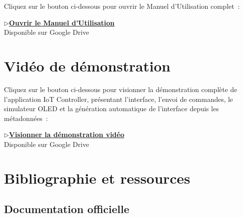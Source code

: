\documentclass[12pt, a4paper]{report}
\begin{document}
Cliquez sur le bouton ci-dessous pour ouvrir le Manuel d'Utilisation
complet~:

\vspace{1cm}
\begin{center}
\begin{tcolorbox}[
  enhanced, colback=bleuClair, colframe=bleuPrincipal,
  boxrule=1.5pt, arc=6pt, width=0.72\textwidth,
  halign=center, left=12pt, right=12pt,
  top=14pt, bottom=14pt,
]
  \href{https://drive.google.com/file/d/1Pbwp4Xd4XEElCwQaQ0MdwwGoU7PmZTh9/view?usp=drive_link}{%
    \textcolor{bleuFonce}{\Large\bfseries
    $\triangleright$\enspace Ouvrir le Manuel d'Utilisation}%
  }\\[8pt]
  {\small\textcolor{griMoyen}{Disponible sur Google Drive}}
\end{tcolorbox}
\end{center}

\chapter{Vid\'eo de d\'emonstration}

Cliquez sur le bouton ci-dessous pour visionner la d\'emonstration
compl\`ete de l'application IoT Controller, pr\'esentant l'interface,
l'envoi de commandes, le simulateur OLED et la g\'en\'eration
automatique de l'interface depuis les m\'etadonn\'ees~:

\vspace{1cm}
\begin{center}
\begin{tcolorbox}[
  enhanced, colback=bleuClair, colframe=bleuPrincipal,
  boxrule=1.5pt, arc=6pt, width=0.72\textwidth,
  halign=center, left=12pt, right=12pt,
  top=14pt, bottom=14pt,
]
  \href{https://drive.google.com/file/d/1ZKkiPMIA36Nbi1gCWcmVh21lzbyH2on8/view?usp=sharing}{%
    \textcolor{bleuFonce}{\Large\bfseries
    $\triangleright$\enspace Visionner la d\'emonstration vid\'eo}%
  }\\[8pt]
  {\small\textcolor{griMoyen}{Disponible sur Google Drive}}
\end{tcolorbox}
\end{center}

\chapter{Bibliographie et ressources}

\section{Documentation officielle}
\end{document}
